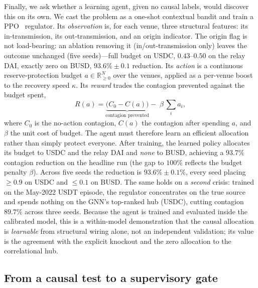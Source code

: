 \documentclass[sigconf,anonymous]{acmart}
\begin{document}
Finally, we ask whether a learning agent, given no causal labels, would discover this on its own. We
cast the problem as a one-shot contextual bandit and train a PPO~\cite{schulman2017ppo} regulator.
Its \emph{observation} is, for each venue, three structural features: its in-transmission, its
out-transmission, and an origin indicator. The origin flag is not load-bearing: an ablation
removing it (in/out-transmission only) leaves the outcome unchanged (five seeds)---full budget
on USDC, $0.43$--$0.50$ on the relay DAI, exactly zero on BUSD, $93.6\%\pm0.1$ reduction. Its \emph{action} is a continuous reserve-protection budget $a\in\mathbb{R}^N_{\ge 0}$
over the venues, applied as a per-venue boost to the recovery speed $\kappa$. Its \emph{reward}
trades the contagion prevented against the budget spent,
\begin{equation}
R(a)=\underbrace{\big(C_0-C(a)\big)}_{\text{contagion prevented}}-\;\beta\,\textstyle\sum_i a_i,
\end{equation}
where $C_0$ is the no-action contagion, $C(a)$ the contagion after spending $a$, and $\beta$ the unit
cost of budget. The agent must therefore learn an efficient allocation rather than simply protect
everyone. After training, the learned policy allocates
its budget to USDC and the relay DAI and \emph{none} to BUSD, achieving a $93.7\%$ contagion reduction
on the headline run (the gap to $100\%$ reflects the budget penalty $\beta$). Across five seeds
the reduction is $93.6\%\pm0.1\%$, every seed placing $\ge0.9$ on USDC and $\le0.1$ on BUSD. The
same holds on a \emph{second} crisis: trained on the May-2022 USDT episode, the regulator
concentrates on the true source and spends nothing on the GNN's top-ranked hub (USDC), cutting
contagion $89.7\%$ across three seeds. Because the agent is trained and evaluated inside the calibrated
model, this is a within-model demonstration that the causal allocation is \emph{learnable} from
structural wiring alone, not an independent validation; its value is the agreement with the
explicit knockout and the zero allocation to the correlational hub.


\subsection{From a causal test to a supervisory gate}
\end{document}
